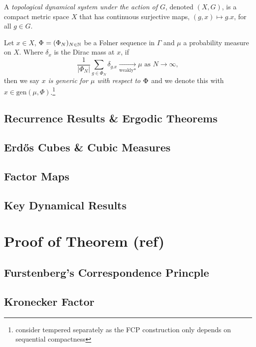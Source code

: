 \documentclass[
  british,
]{article}
\theoremstyle{plain}
\theoremstyle{definition}
\theoremstyle{remark}
\newcommand{\Folner}[1][\vphantom{}]{{\Phi}_{#1}}
\newcommand{\GroupAction}[2]{{#1}.{#2}}
\newcommand{\GroupElement}{{g}}
\newcommand{\Group}{{G}}
\begin{document}
A \emph{topological dynamical system under the action of \(\Group\)},
denoted \((X,\Group)\), is a compact metric space \(X\) that has
continuous surjective maps,
\((\GroupElement,x)\mapsto \GroupAction{\GroupElement}{x}\), for all
\(\GroupElement\in\Group\).

Let \(x\in X\), \(\Folner=(\Folner[N])_{N\in\mathbb{N}}\) be a Følner
sequence in \(\Gamma\) and \(\mu\) a probability measure on \(X\). Where
\(\delta_x\) is the Dirac mass at \(x\), if
\[\frac{1}{|\Folner[N]|}\sum_{\GroupElement\in\Folner[N]}\delta_{\GroupAction{\GroupElement}{x}}\underset{\text{weakly*}}{\longrightarrow} \mu \text{ as }N\rightarrow\infty, \]
then we say \emph{\(x\) is generic for \(\mu\) with respect to
\(\Folner\)} and we denote this with
\(x\in\text{gen}(\mu,\Phi)\).\footnote{consider tempered separately as
  the FCP construction only depends on sequential compactness}

\subsection{Recurrence Results \& Ergodic
Theorems}\label{recurrence-results-ergodic-theorems}

\subsection{Erdős Cubes \& Cubic
Measures}\label{erdux151s-cubes-cubic-measures}

\subsection{Factor Maps}\label{factor-maps}

\subsection{Key Dynamical Results}\label{key-dynamical-results}

\section{Proof of Theorem (ref)}\label{proof-of-theorem-ref}

\subsection{Furstenberg's Correspondence
Princple}\label{furstenbergs-correspondence-princple}

\subsection{Kronecker Factor}\label{kronecker-factor}
\end{document}
